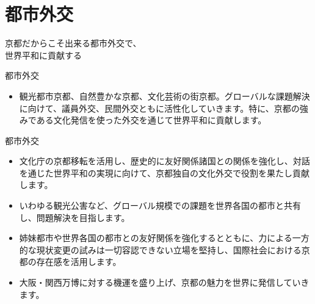 \documentclass[dvipdfmx]{beamer}
\begin{document}
\section{都市外交}
    \begin{frame}{}{}
        \sectionpage
        \begin{center}
            \begin{large}
                \alert{京都だからこそ出来る都市外交で、}\\\alert{世界平和に貢献する}
            \end{large}
        \end{center}
    \end{frame}

    \begin{frame}{都市外交}{}
        \begin{small}
            \begin{itemize}
                \setlength{\itemsep}{2mm}
                \item 観光都市京都、自然豊かな京都、文化芸術の街京都。グローバルな課題解決に向けて、議員外交、民間外交ともに活性化していきます。特に、京都の強みである文化発信を使った外交を通じて世界平和に貢献します。
            \end{itemize}
        \end{small}
    \end{frame}

    \begin{frame}{都市外交}{}
        \begin{small}
            \begin{itemize}
                \setlength{\itemsep}{2mm}
                \item 文化庁の京都移転を活用し、歴史的に友好関係諸国との関係を強化し、対話を通じた世界平和の実現に向けて、京都独自の文化外交で役割を果たし貢献します。
                \item いわゆる観光公害など、グローバル規模での課題を世界各国の都市と共有し、問題解決を目指します。
                \item 姉妹都市や世界各国の都市との友好関係を強化するとともに、力による一方的な現状変更の試みは一切容認できない立場を堅持し、国際社会における京都の存在感を活用します。
                \item 大阪・関西万博に対する機運を盛り上げ、京都の魅力を世界に発信していきます。
            \end{itemize}
        \end{small}
    \end{frame}
    
\end{document}
